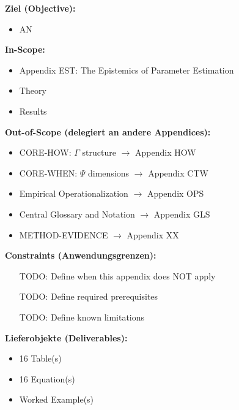 
\begin{tcolorbox}[
    colback=orange!5!white,
    colframe=orange!75!black,
    title={\textbf{Appendix Scope: Ziel / In-Scope / Out-of-Scope / Constraints}},
    fonttitle=\bfseries
]

\textbf{Ziel (Objective):}
\begin{itemize}[nosep]
    \item AN
\end{itemize}

\textbf{In-Scope:}
\begin{itemize}[nosep]
    \item Appendix EST: The Epistemics of Parameter Estimation
    \item Theory
    \item Results
\end{itemize}

\textbf{Out-of-Scope (delegiert an andere Appendices):}
\begin{itemize}[nosep]
    \item CORE-HOW: $\Gamma$ structure $\rightarrow$ Appendix HOW
    \item CORE-WHEN: $\Psi$ dimensions $\rightarrow$ Appendix CTW
    \item Empirical Operationalization $\rightarrow$ Appendix OPS
    \item Central Glossary and Notation $\rightarrow$ Appendix GLS
    \item METHOD-EVIDENCE $\rightarrow$ Appendix XX
\end{itemize}

\textbf{Constraints (Anwendungsgrenzen):}
\begin{itemize}[nosep]
    \item [TODO: Define when this appendix does NOT apply]
    \item [TODO: Define required prerequisites]
    \item [TODO: Define known limitations]
\end{itemize}

\textbf{Lieferobjekte (Deliverables):}
\begin{itemize}[nosep]
    \item 16 Table(s)
    \item 16 Equation(s)
    \item Worked Example(s)
\end{itemize}

\end{tcolorbox}


